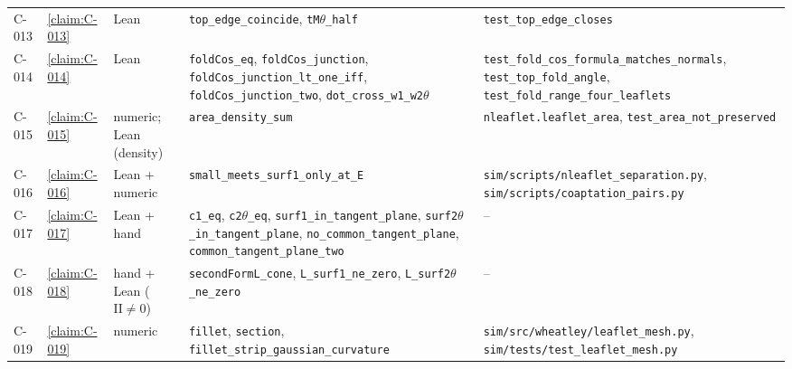 \begin{longtable}{@{}l>{\raggedright}p{}>{\raggedright}p{}>{\raggedright}p{}>{\raggedright\arraybackslash}p{}@{}}
C-013 & \cref{claim:C-013} & Lean & \texttt{top\_\allowbreak{}edge\_\allowbreak{}coincide}, \texttt{tM\ensuremath{\theta}\_\allowbreak{}half} & \texttt{test\_\allowbreak{}top\_\allowbreak{}edge\_\allowbreak{}closes}\\
C-014 & \cref{claim:C-014} & Lean & \texttt{foldCos\_\allowbreak{}eq}, \texttt{foldCos\_\allowbreak{}junction}, \texttt{foldCos\_\allowbreak{}junction\_\allowbreak{}lt\_\allowbreak{}one\_\allowbreak{}iff}, \texttt{foldCos\_\allowbreak{}junction\_\allowbreak{}two}, \texttt{dot\_\allowbreak{}cross\_\allowbreak{}w1\_\allowbreak{}w2\ensuremath{\theta}} & \texttt{test\_\allowbreak{}fold\_\allowbreak{}cos\_\allowbreak{}formula\_\allowbreak{}matches\_\allowbreak{}normals}, \texttt{test\_\allowbreak{}top\_\allowbreak{}fold\_\allowbreak{}angle}, \texttt{test\_\allowbreak{}fold\_\allowbreak{}range\_\allowbreak{}four\_\allowbreak{}leaflets}\\
C-015 & \cref{claim:C-015} & numeric; Lean (density) & \texttt{area\_\allowbreak{}density\_\allowbreak{}sum} & \texttt{nleaflet.\allowbreak{}leaflet\_\allowbreak{}area}, \texttt{test\_\allowbreak{}area\_\allowbreak{}not\_\allowbreak{}preserved}\\
C-016 & \cref{claim:C-016} & Lean + numeric & \texttt{small\_\allowbreak{}meets\_\allowbreak{}surf1\_\allowbreak{}only\_\allowbreak{}at\_\allowbreak{}E} & \texttt{sim/\allowbreak{}scripts/\allowbreak{}nleaflet\_\allowbreak{}separation.\allowbreak{}py}, \texttt{sim/\allowbreak{}scripts/\allowbreak{}coaptation\_\allowbreak{}pairs.\allowbreak{}py}\\
C-017 & \cref{claim:C-017} & Lean + hand & \texttt{c1\_\allowbreak{}eq}, \texttt{c2\ensuremath{\theta}\_\allowbreak{}eq}, \texttt{surf1\_\allowbreak{}in\_\allowbreak{}tangent\_\allowbreak{}plane}, \texttt{surf2\ensuremath{\theta}\_\allowbreak{}in\_\allowbreak{}tangent\_\allowbreak{}plane}, \texttt{no\_\allowbreak{}common\_\allowbreak{}tangent\_\allowbreak{}plane}, \texttt{common\_\allowbreak{}tangent\_\allowbreak{}plane\_\allowbreak{}two} & --\\
C-018 & \cref{claim:C-018} & hand + Lean ($\mathrm{II}\ne0$) & \texttt{secondFormL\_\allowbreak{}cone}, \texttt{L\_\allowbreak{}surf1\_\allowbreak{}ne\_\allowbreak{}zero}, \texttt{L\_\allowbreak{}surf2\ensuremath{\theta}\_\allowbreak{}ne\_\allowbreak{}zero} & --\\
C-019 & \cref{claim:C-019} & numeric & \texttt{fillet}, \texttt{section}, \texttt{fillet\_\allowbreak{}strip\_\allowbreak{}gaussian\_\allowbreak{}curvature} & \texttt{sim/\allowbreak{}src/\allowbreak{}wheatley/\allowbreak{}leaflet\_\allowbreak{}mesh.\allowbreak{}py}, \texttt{sim/\allowbreak{}tests/\allowbreak{}test\_\allowbreak{}leaflet\_\allowbreak{}mesh.\allowbreak{}py}\\

\end{longtable}
